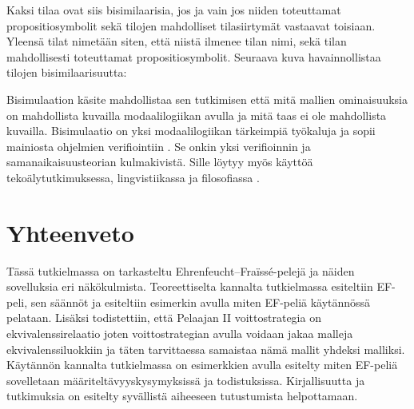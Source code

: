 \documentclass[finnish]{tktltiki2}
\theoremstyle{definition}
\theoremstyle{remark}
\begin{document}
Kaksi tilaa ovat siis bisimilaarisia, jos ja vain jos niiden toteuttamat propositiosymbolit sekä tilojen mahdolliset tilasiirtymät vastaavat toisiaan. Yleensä tilat nimetään siten, että niistä ilmenee tilan nimi, sekä tilan mahdollisesti toteuttamat propositiosymbolit. Seuraava kuva havainnollistaa tilojen bisimilaarisuutta:

\begin{center}
\end{center}

Bisimulaation käsite mahdollistaa sen tutkimisen että mitä mallien ominaisuuksia on mahdollista kuvailla modaalilogiikan avulla ja mitä taas ei ole mahdollista kuvailla. Bisimulaatio on yksi modaalilogiikan tärkeimpiä työkaluja ja sopii mainiosta ohjelmien verifiointiin \cite{Bla01}. Se onkin yksi verifioinnin ja samanaikaisuusteorian kulmakivistä. Sille löytyy myös käyttöä tekoälytutkimuksessa, lingvistiikassa ja filosofiassa \cite{Bla06}.

\section{Yhteenveto}
Tässä tutkielmassa on tarkasteltu Ehrenfeucht--Fraïssé-pelejä ja näiden sovelluksia eri näkökulmista. Teoreettiselta kannalta tutkielmassa esiteltiin EF-peli, sen säännöt ja esiteltiin esimerkin avulla miten EF-peliä käytännössä pelataan. Lisäksi todistettiin, että Pelaajan II voittostrategia on ekvivalenssirelaatio joten voittostrategian avulla voidaan jakaa malleja ekvivalenssiluokkiin ja täten tarvittaessa samaistaa nämä mallit yhdeksi malliksi. Käytännön kannalta tutkielmassa on esimerkkien avulla esitelty miten EF-peliä sovelletaan määriteltävyyskysymyksissä ja todistuksissa. Kirjallisuutta ja tutkimuksia on esitelty syvällistä aiheeseen tutustumista helpottamaan.
\end{document}
